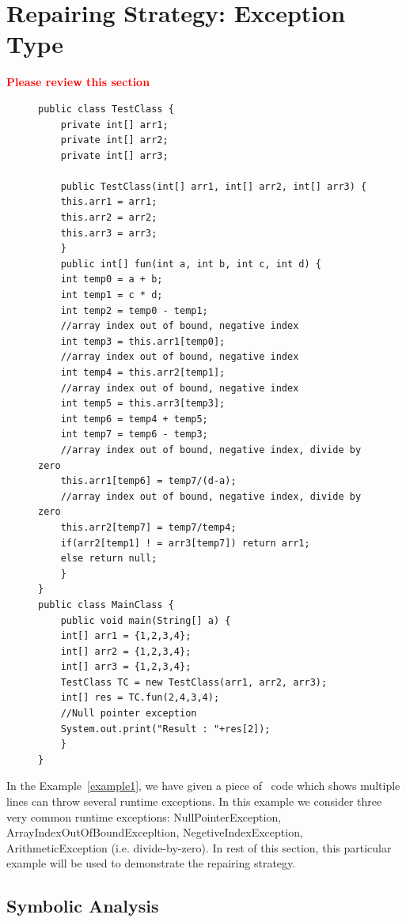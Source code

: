 \section{Repairing Strategy: Exception Type}
\label{sec:strgEx}

\textcolor{red}{\textbf{Please review this section}}\newline

\begin{figure}[t]
\lstset{language=Java, caption=Java code which may throws runtime exceptions,
label=example1}
\begin{lstlisting}[countblanklines=false]
public class TestClass {
    private int[] arr1;
    private int[] arr2;
    private int[] arr3;

    public TestClass(int[] arr1, int[] arr2, int[] arr3) {
	this.arr1 = arr1;
	this.arr2 = arr2;
	this.arr3 = arr3;
    }
    public int[] fun(int a, int b, int c, int d) {
	int temp0 = a + b;
	int temp1 = c * d;
	int temp2 = temp0 - temp1;
	//array index out of bound, negative index
	int temp3 = this.arr1[temp0];
	//array index out of bound, negative index
	int temp4 = this.arr2[temp1];
	//array index out of bound, negative index
	int temp5 = this.arr3[temp3];
	int temp6 = temp4 + temp5;
	int temp7 = temp6 - temp3;
	//array index out of bound, negative index, divide by zero
	this.arr1[temp6] = temp7/(d-a);
	//array index out of bound, negative index, divide by zero
	this.arr2[temp7] = temp7/temp4;
	if(arr2[temp1] ! = arr3[temp7]) return arr1;
	else return null;
    }
}
public class MainClass {
    public void main(String[] a) {
	int[] arr1 = {1,2,3,4};
	int[] arr2 = {1,2,3,4};
	int[] arr3 = {1,2,3,4};
	TestClass TC = new TestClass(arr1, arr2, arr3);
	int[] res = TC.fun(2,4,3,4);
	//Null pointer exception
	System.out.print("Result : "+res[2]);
    }    
}
\end{lstlisting}
\end{figure}

In the Example~\ref{example1}, we have given a piece of \java\ code which shows
multiple lines can throw several runtime exceptions.
In this example we consider three very common runtime exceptions:
NullPointerException, ArrayIndexOutOfBoundExcepltion, NegetiveIndexException,
ArithmeticException (i.e. divide-by-zero). In rest of this section, this
particular example will be used to demonstrate the repairing strategy.

\subsection{Symbolic Analysis}
\label{subsec:symb}


